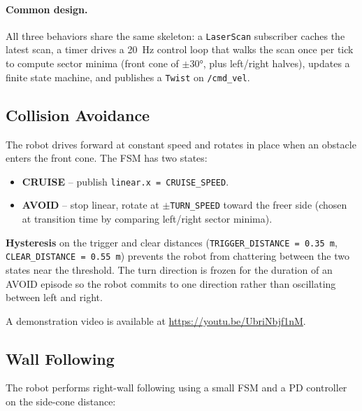 \documentclass[12pt, a4paper]{article}
\begin{document}
\paragraph{Common design.}
All three behaviors share the same skeleton: a \texttt{LaserScan} subscriber
caches the latest scan, a timer drives a 20~Hz control loop that walks the
scan once per tick to compute sector minima (front cone of $\pm30°$, plus
left/right halves), updates a finite state machine, and publishes a
\texttt{Twist} on \texttt{/cmd\_vel}.

\subsection{Collision Avoidance}

The robot drives forward at constant speed and rotates in place when an
obstacle enters the front cone.  The FSM has two states:

\begin{itemize}
    \item \textbf{CRUISE} -- publish \texttt{linear.x = CRUISE\_SPEED}.
    \item \textbf{AVOID} -- stop linear, rotate at $\pm$\texttt{TURN\_SPEED}
          toward the freer side (chosen at transition time by comparing
          left/right sector minima).
\end{itemize}

\textbf{Hysteresis} on the trigger and clear distances
(\texttt{TRIGGER\_DISTANCE = 0.35~m}, \texttt{CLEAR\_DISTANCE = 0.55~m})
prevents the robot from chattering between the two states near the threshold.
The turn direction is frozen for the duration of an AVOID episode so the robot
commits to one direction rather than oscillating between left and right.

A demonstration video is available at
\url{https://youtu.be/UbriNbjf1nM}.

\subsection{Wall Following}

The robot performs right-wall following using a small FSM and a PD controller
on the side-cone distance:
\end{document}
